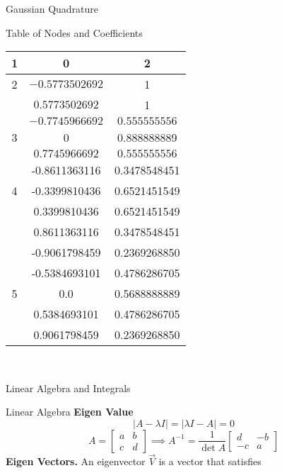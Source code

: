 \documentclass{article}
\begin{document}
\begin{multicols*}{3}
\begin{blackbox}{Gaussian Quadrature}
\begin{redbox}{Table of Nodes and Coefficients}
\begin{center}
\begin{tabular}{c|cc}
                    \hline
                    1 & 0 & 2\\
                    \hline
                    2 & $-0.5773502692$ & 1\\
                    & $0.5773502692$ & 1\\
                    \hline
                    & $-0.7745966692$ & $0.555555556$\\
                    3 & 0 & 0.888888889\\
                    & $0.7745966692$ & $0.555555556$\\
                    \hline
                    & -0.8611363116 &0.3478548451\\
                    4&-0.3399810436& 0.6521451549\\
                    &0.3399810436 &0.6521451549\\
                    &0.8611363116 &0.3478548451\\
                    \hline
                    &-0.9061798459 &0.2369268850\\
                    &-0.5384693101& 0.4786286705\\
                    5 &0.0 &0.5688888889\\
                    &0.5384693101 &0.4786286705\\
                    &0.9061798459& 0.2369268850\\
                \end{tabular}
            \end{center}
        \end{redbox}\\[-2ex]
    \end{blackbox}
    \begin{blackbox}{Linear Algebra and Integrals}
        \begin{pinkbox}{Linear Algebra}      
            \textbf{Eigen Value}\\[-2ex]
            \[|A - \lambda I| = |\lambda I - A| = 0\]
            \[A = \begin{bmatrix}
                a & b\\
                c & d
            \end{bmatrix} \implies A^{-1} = \frac{1}{\det A}\begin{bmatrix}
                d & -b\\
                -c & a
            \end{bmatrix}\]
            \textbf{Eigen Vectors.} An eigenvector $\vec{V}$ is a vector that satisfies\\[-4ex]

\end{pinkbox}
\end{blackbox}
\end{multicols*}
\end{document}
